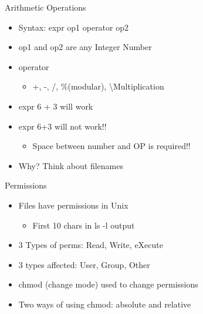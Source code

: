 \documentclass{beamer}
\begin{document}
\begin{frame}{Arithmetic Operations}
\begin{itemize}
\item Syntax: expr op1 operator op2
\item op1 and op2 are any Integer Number
\item operator
\begin{itemize}
\item +, -, /, \%(modular), \textbackslash * Multiplication
\end{itemize}
\item expr 6 + 3 will work
\item expr 6+3 will not work!!
\begin{itemize}
\item Space between number and OP is required!!
\end{itemize}
\item Why? Think about filenames
\end{itemize}
\end{frame}

\begin{frame}{Permissions}
\begin{itemize}
\item Files have permissions in Unix
\begin{itemize}
\item First 10 chars in ls -l output
\end{itemize}
\item 3 Types of perms: Read, Write, eXecute
\item 3 types affected: User, Group, Other
\item chmod (change mode) used to change permissions
\item Two ways of using chmod: absolute and relative
\end{itemize}
\end{frame}
\end{document}
